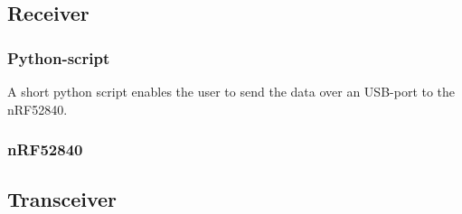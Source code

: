 \subsection{Receiver}

\subsubsection{Python-script}
A short python script enables the user to send the data over an USB-port to the nRF52840.
\lstset{language=Python, showstringspaces=false}
%


\subsubsection{nRF52840}


\subsection{Transceiver}